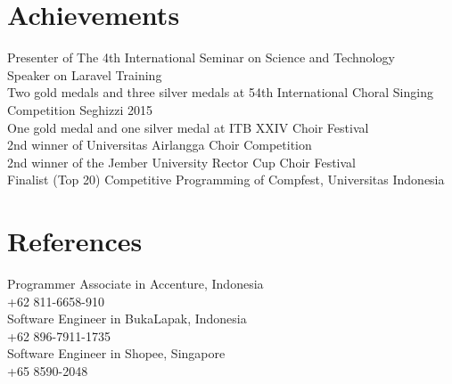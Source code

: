 \documentclass[letterpaper]{deedy-resume} %
\begin{document}
\newpage %
\begin{minipage}[t]{0.39\textwidth}


\section{Achievements}
  Presenter of The 4th International Seminar on Science and Technology \\
  Speaker on Laravel Training \\
  Two gold medals and three silver medals at 54th International Choral Singing Competition Seghizzi 2015 \\
  One gold medal and one silver medal at ITB XXIV Choir Festival \\
  2nd winner of Universitas Airlangga Choir Competition \\
  2nd winner of the Jember University Rector Cup Choir Festival \\
  Finalist (Top 20) Competitive Programming of Compfest, Universitas Indonesia \\
\sectionspace


\section{References}
  Programmer Associate in Accenture, Indonesia\\
  +62 811-6658-910\\
  Software Engineer in BukaLapak, Indonesia\\
  +62 896-7911-1735\\
  Software Engineer in Shopee, Singapore\\
  +65 8590-2048\\

\end{minipage} %
\end{document}
